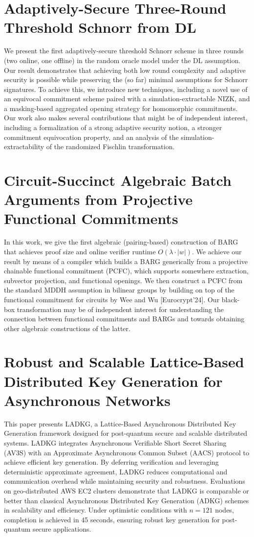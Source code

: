 \documentclass[11pt,oneside]{book}
\theoremstyle{definition}
\theoremstyle{remark}
\theoremstyle{plain}
\begin{document}
\section{\cite{cryptoeprint:2025/1941} Adaptively-Secure Three-Round Threshold Schnorr from DL}
We present the first adaptively-secure threshold Schnorr scheme in three rounds (two online, one offline) in the random oracle model under the DL assumption. Our result demonstrates that achieving both low round complexity and adaptive security is possible while preserving the (so far) minimal assumptions for Schnorr signatures.
To achieve this, we introduce new techniques, including a novel use of an equivocal commitment scheme paired with a simulation-extractable NIZK, and a masking-based aggregated opening strategy for homomorphic commitments. Our work also makes several contributions that might be of independent interest, including a formalization of a strong adaptive security notion, a stronger commitment equivocation property, and an analysis of the simulation-extractability of the randomized Fischlin transformation.

\section{\cite{cryptoeprint:2025/1943} Circuit-Succinct Algebraic Batch Arguments from Projective Functional Commitments}
 In this work, we give the first algebraic (pairing-based) construction of BARG that achieves proof size and online verifier runtime $O(\lambda \cdot |w|)$. We achieve our result by means of a compiler which builds a BARG generically from a projective chainable functional commitment (PCFC), which supports somewhere extraction, subvector projection, and functional openings. We then construct a PCFC from the standard MDDH assumption in bilinear groups by building on top of the functional commitment for circuits by Wee and Wu [Eurocrypt'24]. Our black-box transformation may be of independent interest for understanding the connection between functional commitments and BARGs and towards obtaining other algebraic constructions of the latter.
 
 \section{\cite{cryptoeprint:2025/1946} Robust and Scalable Lattice-Based Distributed Key Generation for Asynchronous Networks}
 This paper presents LADKG, a Lattice-Based Asynchronous Distributed Key Generation framework designed for post-quantum secure and scalable distributed systems. LADKG integrates Asynchronous Verifiable Short Secret Sharing (AV3S) with an Approximate Asynchronous Common Subset (AACS) protocol to achieve efficient key generation. By deferring verification and leveraging deterministic approximate agreement, LADKG reduces computational and communication overhead while maintaining security and robustness. Evaluations on geo-distributed AWS EC2 clusters demonstrate that LADKG is comparable or better than classical Asynchronous Distributed Key Generation (ADKG) schemes in scalability and efficiency. Under optimistic conditions with $n=121$ nodes, completion is achieved in 45 seconds, ensuring robust key generation for post-quantum secure applications.
 
\end{document}
